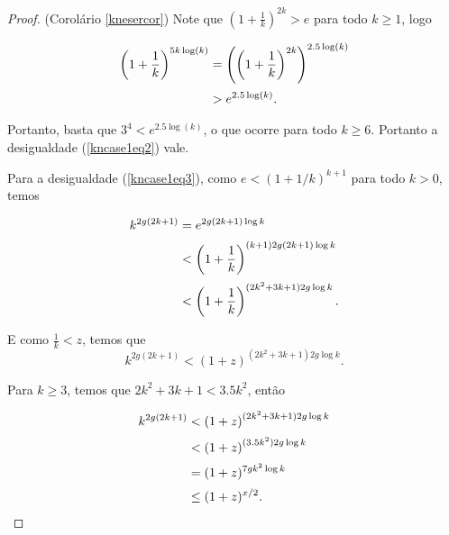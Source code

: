 \begin{proof}{(Corolário \ref{knesercor})}
Note que $(1+\frac{1}{k})^{2k} > e$ para todo $k\geq 1$, logo

\begin{equation*}
\setlength{\jot}{5pt}
\begin{aligned}
\left(1+\frac{1}{k}\right)^{5k\log(k)} &= \left(\left(1+\frac{1}{k}\right)^{2k}\right)^{2.5\log(k)}\\
&> e^{2.5\log(k)}.
\end{aligned}
\end{equation*}

Portanto, basta que $3^4 < e^{2.5\log(k)}$, o que ocorre para todo $k\geq 6$. Portanto a desigualdade (\ref{kncase1eq2}) vale.


\vspace{1em}Para a desigualdade (\ref{kncase1eq3}), como $e < (1+1/k)^{k+1}$ para todo $k>0$, temos

\begin{equation*}
\setlength{\jot}{5pt}
\begin{aligned}
k^{2g(2k+1)} & = e^{2g(2k+1)\log k}\\
&< \left(1+\frac{1}{k}\right)^{(k+1)2g(2k+1)\log k}\\
&< \left(1+\frac{1}{k}\right)^{(2k^2+3k+1)2g\log k}.\\
\end{aligned}
\end{equation*}

E como $\frac{1}{k} < z$, temos que \[k^{2g(2k+1)} < \left(1+z\right)^{(2k^2+3k+1)2g\log k}.\]

Para $k \geq 3$, temos que $2k^2+3k+1<3.5k^2$, então 

\begin{equation*}
\setlength{\jot}{5pt}
\begin{aligned}
k^{2g(2k+1)} &< \left(1+z\right)^{(2k^2+3k+1)2g\log k}\\
&< \left(1+z\right)^{(3.5k^2)2g\log k}\\
&= (1+z)^{7gk^2\log k} \\
&\leq (1+z)^{x/2}.
\end{aligned}
\end{equation*}


\end{proof}
